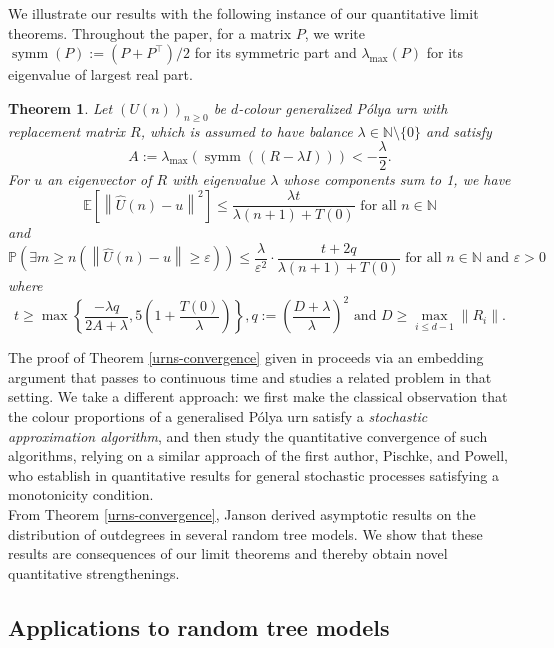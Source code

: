 \documentclass[12pt]{amsart}
\newtheorem{theorem}{Theorem}[section]
\theoremstyle{definition}
\theoremstyle{remark}
\newcommand{\norm}[1]{\left\lVert#1\right\rVert}
\newcommand{\NN}{\mathbb{N}}
\newcommand{\PP}{\mathbb{P}}
\newcommand{\EE}{\mathbb{E}}
\newcommand{\eps}{\varepsilon}
\begin{document}
 
We illustrate our results with the following instance of our quantitative limit 
theorems. Throughout the paper, for a matrix $P$, we write $\operatorname{symm}(P):= (P+P^\top)/2$ 
for its symmetric part and $\lambda_{\max}(P)$ for its eigenvalue of largest real 
part.
 \begin{theorem}
 \label{thrm:main:app}
      Let $(U(n))_{n\geq 0}$ be $d$-colour generalized P\'olya urn with replacement matrix $R$, which is assumed to have balance $\lambda \in \NN\setminus\{0\}$ and satisfy 
      \[
A:=\lambda_{\max}(\operatorname{symm}((R - \lambda I) )) < -\frac{\lambda}{2}. 
\]
For $u$ an eigenvector of $R$ with eigenvalue $\lambda$ whose components sum to 1, we have
  \[
\EE\left[\norm{\hat{U}(n)-u}^2\right]\leq\frac{\lambda t}{\lambda(n+1)+T(0)} \mbox{ for all } n \in \NN\]
and 
\[
\PP\left(\exists m\geq n\left(\norm{\hat{U}(n)-u}\geq \varepsilon\right)\right)\leq \frac{\lambda}{\varepsilon^2}\cdot\frac{t+2q}{\lambda(n+1)+T(0)} \mbox{ for all } n \in \NN \mbox{ and }\eps>0
\]
where 
\[
t\geq \max\left\{\frac{-\lambda q}{2A+\lambda},5\left(1+\frac{T(0)}{\lambda}\right)\right\}, q:=\left(\frac{D+\lambda}{\lambda}\right)^2 \mbox{ and } D\ge \max_{i\le d-1}\norm{R_i}.
\]
 \end{theorem}
The proof of Theorem \ref{urns-convergence} given in \cite{janson2004functional,janson2005asymptotic} proceeds via an embedding argument that passes to continuous time and studies a related problem in that setting. We take a different approach: we first make the classical observation that the colour proportions of a generalised P\'olya urn satisfy a \emph{stochastic approximation algorithm}, and then study the quantitative convergence of such algorithms, relying on a similar approach of the first author, Pischke, and Powell, who establish in \cite{NeriPischkePowell:fejer:rates} quantitative results for general stochastic processes satisfying a monotonicity condition.\\


From Theorem \ref{urns-convergence}, Janson \cite{janson2005asymptotic} derived asymptotic results on the distribution of outdegrees in several random tree models. We show that these results are consequences of our limit theorems and thereby obtain novel quantitative strengthenings.

\subsection{Applications to random tree models}
\end{document}
